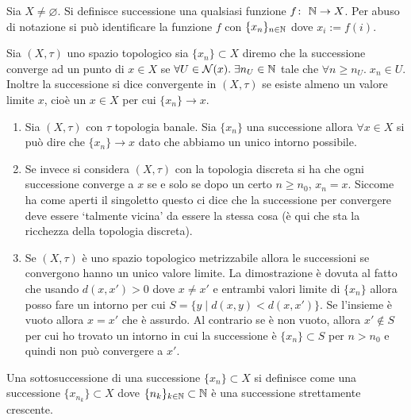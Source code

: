 \begin{definition}
	Sia $X \neq \varnothing$. Si definisce successione una qualsiasi funzione $f \colon\ \mathbb{N} \rightarrow X$. Per abuso di notazione si può identificare la funzione $f$ con $\{x_n\}_{n\in\mathbb{N}}$ dove $x_i := f(i)$.
\end{definition}

\begin{definition}
	Sia $(X, \tau)$ uno spazio topologico sia $\{x_n\} \subset X$ diremo che la successione converge ad un punto di $x \in X$ se $\forall U \in \mathcal{N}(x) . \; \exists n_U \in \mathbb{N}$ tale che $\forall n \ge n_U . \; x_n \in U$. Inoltre la successione si dice convergente in $(X,\tau)$ se esiste almeno un valore limite $x$, cioè un $x \in X$ per cui $\{x_n\} \rightarrow x$.
\end{definition}

\begin{example}
\begin{enumerate}
	\item Sia $(X,\tau)$ con $\tau$ topologia banale. Sia $\{x_n\}$ una 
		successione allora $\forall x \in X$ si può dire che $\{x_n\} 
		\rightarrow x$ dato che abbiamo un unico intorno possibile. 
	\item Se invece si considera $(X,\tau)$ con la topologia discreta si 
		ha che ogni successione converge a $x$ se e solo se dopo un certo 
		$n \ge n_0$, $x_n = x$. Siccome ha come aperti il singoletto questo ci 
		dice che la successione per convergere deve essere `talmente vicina' da 
		essere la stessa cosa (è qui che sta la ricchezza della topologia 
		discreta).
	\item Se $(X,\tau)$ è uno spazio topologico metrizzabile allora le 
		successioni se convergono hanno un unico valore limite. La 
		dimostrazione è dovuta al fatto che usando $d(x,x') > 0$ dove 
		$x \neq x' $ e entrambi valori limite di $\{x_n\}$ allora posso 
		fare un intorno per cui $S = \{y\; |\; d(x, y) < d(x,x')\}$. Se 
		l'insieme è vuoto allora $x = x'$ che è assurdo. Al contrario se 
		è non vuoto, allora $x' \not\in S$ per cui ho trovato un intorno 
		in cui la successione è $\{x_n\} \subset S$ per $n > n_0$ e quindi 
		non può convergere a $x'$. 
\end{enumerate}
\end{example}

\begin{definition}
	Una sottosuccessione di una successione $\{x_n\} \subset X$ si definisce come una successione $\{x_{n_k}\} \subset X$ dove $\{n_k\}_{k\in \mathbb{N}} \subset \mathbb{N}$ è una successione strettamente crescente. 
\end{definition}

